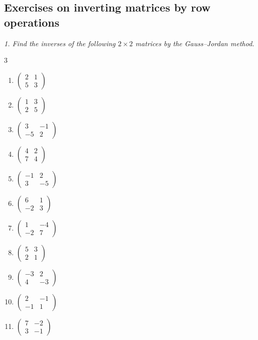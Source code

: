 \subsection{Exercises on inverting matrices by row operations}
\bigskip
\emph{1. Find the inverses of the following $2\times 2$ matrices by the
Gauss–Jordan method.}
\bigskip
\begin{multicols}{3}\raggedright
\begin{enumerate}[label=\arabic*.,  leftmargin=*]
\item $\begin{pmatrix}2&1\\5&3\end{pmatrix}$
\item $\begin{pmatrix}1&3\\2&5\end{pmatrix}$
\item $\begin{pmatrix}3&-1\\-5&2\end{pmatrix}$
\item $\begin{pmatrix}4&2\\7&4\end{pmatrix}$
\item $\begin{pmatrix}-1&2\\3&-5\end{pmatrix}$
\item $\begin{pmatrix}6&1\\-2&3\end{pmatrix}$
\item $\begin{pmatrix}1&-4\\-2&7\end{pmatrix}$
\item $\begin{pmatrix}5&3\\2&1\end{pmatrix}$
\item $\begin{pmatrix}-3&2\\4&-3\end{pmatrix}$
\item $\begin{pmatrix}2&-1\\-1&1\end{pmatrix}$
\item $\begin{pmatrix}7&-2\\3&-1\end{pmatrix}$

\end{enumerate}
\end{multicols}
